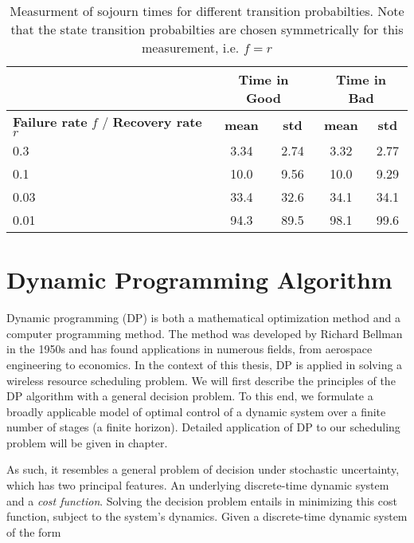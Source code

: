 \begin{table}[h]
  \begin{center}
  \begin{tabular}{|p{3.5cm}|c|c|c|c|}
  \hline 
  & \multicolumn{2}{|c|}{\textbf{Time in Good}} &
  \multicolumn{2}{|c|}{\textbf{Time in Bad}} \\
  \hline
  \textbf{Failure rate} $f$ / \textbf{Recovery rate} $r$ & \textbf{mean} & \textbf{std} & \textbf{mean}
  & \textbf{std}\\
  \hline \hline
  0.3 & 3.34 & 2.74 & 3.32 & 2.77 \\
  \hline 
  0.1 & 10.0 & 9.56 & 10.0 & 9.29 \\
  \hline 
  0.03 & 33.4 & 32.6 & 34.1 & 34.1 \\
  \hline 
  0.01 & 94.3 & 89.5 & 98.1 & 99.6 \\
  \hline 
  \end{tabular}
  \caption{Measurment of sojourn times for different transition probabilties. Note that the state transition
  probabilties are chosen symmetrically for this measurement, i.e. $f=r$}
  \label{tab:sojournTime}
  \end{center}
  \end{table}


\section{Dynamic Programming Algorithm}

Dynamic programming (DP) is both a mathematical optimization method and a
computer programming method. The method was developed by Richard Bellman in the
1950s and has found applications in numerous fields, from aerospace engineering
to economics. In the context of this thesis, DP is applied in solving a wireless
resource scheduling problem. We will first describe the principles of the DP
algorithm with a general decision problem. To this end, we formulate a broadly
applicable model of optimal control of a dynamic system over a finite number of
stages (a finite horizon). Detailed application of DP to our scheduling problem
will be given in chapter. 

As such, it resembles a general problem of decision under stochastic
uncertainty, which has two principal features. An underlying discrete-time
dynamic system and a \textit{cost function}. Solving the decision problem
entails in minimizing this cost function, subject to the system's dynamics.
Given a discrete-time dynamic system of the form

